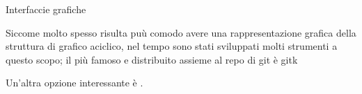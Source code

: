 \capitolo Interfaccie grafiche

Siccome molto spesso risulta pu\`u comodo avere una rappresentazione grafica
della struttura di grafico aciclico, nel tempo sono stati sviluppati molti
strumenti a questo scopo; il pi\`u famoso e distribuito assieme al repo di git
\`e gitk

Un'altra opzione interessante \`e .

